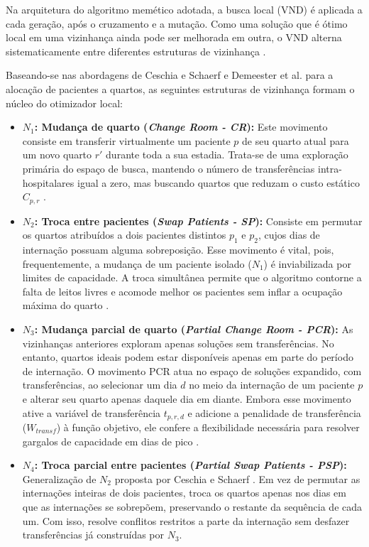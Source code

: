 Na arquitetura do algoritmo memético adotada, a busca local (VND) é aplicada a cada geração, após o cruzamento e a mutação. Como uma solução que é ótimo local em uma vizinhança ainda pode ser melhorada em outra, o VND alterna sistematicamente entre diferentes estruturas de vizinhança \cite{talbi2009metaheuristics}.

Baseando-se nas abordagens de Ceschia e Schaerf \cite{ceschia2011local, ceschia2012modeling} e Demeester et al. \cite{demeester2010hybrid} para a alocação de pacientes a quartos, as seguintes estruturas de vizinhança formam o núcleo do otimizador local:

\begin{itemize}
    \item \textbf{$N_1$: Mudança de quarto (\textit{Change Room - CR}):} Este movimento consiste em transferir virtualmente um paciente $p$ de seu quarto atual para um novo quarto $r'$ durante toda a sua estadia. Trata-se de uma exploração primária do espaço de busca, mantendo o número de transferências intra-hospitalares igual a zero, mas buscando quartos que reduzam o custo estático $C_{p,r}$ \cite{ceschia2012modeling, demeester2010hybrid}.
    
    \item \textbf{$N_2$: Troca entre pacientes (\textit{Swap Patients - SP}):} Consiste em permutar os quartos atribuídos a dois pacientes distintos $p_1$ e $p_2$, cujos dias de internação possuam alguma sobreposição. Esse movimento é vital, pois, frequentemente, a mudança de um paciente isolado ($N_1$) é inviabilizada por limites de capacidade. A troca simultânea permite que o algoritmo contorne a falta de leitos livres e acomode melhor os pacientes sem inflar a ocupação máxima do quarto \cite{ceschia2012modeling, demeester2010hybrid}.
    
    \item \textbf{$N_3$: Mudança parcial de quarto (\textit{Partial Change Room - PCR}):} As vizinhanças anteriores exploram apenas soluções sem transferências. No entanto, quartos ideais podem estar disponíveis apenas em parte do período de internação. O movimento PCR atua no espaço de soluções expandido, com transferências, ao selecionar um dia $d$ no meio da internação de um paciente $p$ e alterar seu quarto apenas daquele dia em diante. Embora esse movimento ative a variável de transferência $t_{p,r,d}$ e adicione a penalidade de transferência ($W_{transf}$) à função objetivo, ele confere a flexibilidade necessária para resolver gargalos de capacidade em dias de pico \cite{ceschia2012modeling}.

    \item \textbf{$N_4$: Troca parcial entre pacientes
    (\textit{Partial Swap Patients - PSP}):} Generalização de $N_2$ proposta por Ceschia e Schaerf \cite{ceschia2011local}. Em vez de permutar as internações inteiras de dois pacientes, troca os quartos apenas nos dias em que as internações se sobrepõem, preservando o restante da sequência de cada um. Com isso, resolve conflitos restritos a parte da internação sem desfazer transferências já construídas por $N_3$.
\end{itemize}

